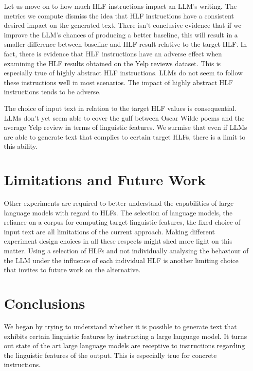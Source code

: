 \documentclass[11pt]{article}
\begin{document}
Let us move on to how much HLF instructions impact an LLM's writing.
The metrics we compute dismiss the idea that HLF instructions have a consistent
desired impact on the generated text.
There isn't conclusive evidence that if we improve the LLM's chances of
producing a better baseline, this will result in a smaller difference between
baseline and HLF result relative to the target HLF.
In fact, there is evidence that HLF instructions have an adverse effect when
examining the HLF results obtained on the Yelp reviews dataset.
This is especially true of highly abstract HLF instructions.
LLMs do not seem to follow these instructions well in most scenarios.
The impact of highly abstract HLF instructions tends to be adverse.

The choice of input text in relation to the target HLF values is consequential.
LLMs don't yet seem able to cover the gulf between Oscar Wilde poems and the
average Yelp review in terms of linguistic features.
We surmise that even if LLMs are able to generate text that complies to certain
target HLFs, there is a limit to this ability.

\section{Limitations and Future Work}

Other experiments are required to better understand the capabilities of large
language models with regard to HLFs.
The selection of language models, the reliance on a corpus for computing target
linguistic features, the fixed choice of input text are all limitations of the
current approach.
Making different experiment design choices in all these respects might shed more
light on this matter.
Using a selection of HLFs and not individually analysing the behaviour of the
LLM under the influence of each individual HLF is another limiting choice that
invites to future work on the alternative.

\section{Conclusions}

We began by trying to understand whether it is possible to generate text that
exhibits certain linguistic features by instructing a large language model.
It turns out state of the art large language models are receptive to
instructions regarding the linguistic features of the output.
This is especially true for concrete instructions.
\end{document}
